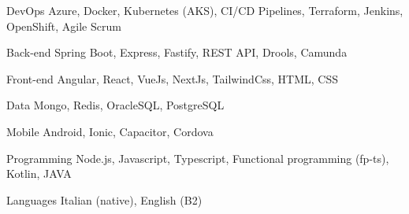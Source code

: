 

\begin{cvskills}

  \cvskill
    {DevOps} %
    {Azure, Docker, Kubernetes (AKS), CI/CD Pipelines, Terraform, Jenkins, OpenShift, Agile Scrum} %

  \cvskill
    {Back-end} %
    {Spring Boot, Express, Fastify, REST API, Drools, Camunda} %

  \cvskill
    {Front-end} %
    {Angular, React, VueJs, NextJs, TailwindCss, HTML, CSS } %

  \cvskill
    {Data} %
    {Mongo, Redis, OracleSQL, PostgreSQL} %

  \cvskill
    {Mobile} %
    {Android, Ionic, Capacitor, Cordova} %

  \cvskill
    {Programming} %
    {Node.js, Javascript, Typescript, Functional programming (fp-ts), Kotlin, JAVA} %

  \cvskill
    {Languages} %
    {Italian (native), English (B2)} %

\end{cvskills}
